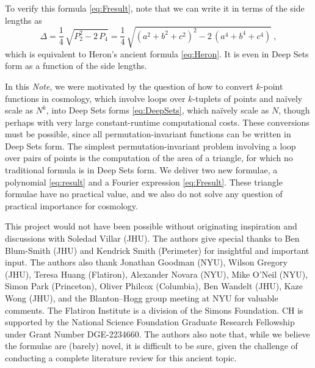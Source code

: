 \documentclass[10pt]{article}
\newcommand{\documentname}{\textsl{Note}}
\newcommand{\secbreak}{\bigskip{\centering\footnotesize%
\rotatebox[origin=c]{55}{$\triangle$}~~~%
\rotatebox[origin=c]{35}{$\triangle$}~~~%
\rotatebox[origin=c]{15}{$\triangle$}\par}\bigskip\noindent}
\begin{document}
To verify this formula \eqref{eq:Fresult}, note that we can write it in terms of the side lengths as
\begin{equation}
\label{eq:HeronDeepSets}
    \Delta = \frac{1}{4} \, \sqrt{
        P_2^2
        - 2 \, P_4
    }
    = \frac{1}{4} \, \sqrt{
        \left( a^2 + b^2 + c^2 \right)^2
        - 2 \, \left( a^4 + b^4 + c^4 \right)
    }~,
\end{equation}
which is equivalent to Heron's ancient formula \eqref{eq:Heron}.
It is even in Deep Sets form as a function of the side lengths.

\secbreak
In this \documentname, we were motivated by the question of how to convert $k$-point functions in cosmology, which involve loops over $k$-tuplets of points and na\"ively scale as $N^k$, into Deep Sets forms \eqref{eq:DeepSets}, which na\"ively scale as $N$, though perhaps with very large constant-runtime computational costs.
These conversions must be possible, since all permutation-invariant functions can be written in Deep Sets form.
The simplest permutation-invariant problem involving a loop over pairs of points is the computation of the area of a triangle, for which no traditional formula is in Deep Sets form.
We deliver two new formulae, a polynomial \eqref{eq:result} and a Fourier expression \eqref{eq:Fresult}.
These triangle formulae have no practical value, and we also do not solve any question of practical importance for cosmology.



{\footnotesize\par\bigskip\noindent
This project would not have been possible without originating inspiration and discussions with Soledad Villar (JHU).
The authors give special thanks to Ben Blum-Smith (JHU) and Kendrick Smith (Perimeter) for insightful and important input.
The authors also thank
  Jonathan Goodman (NYU),
  Wilson Gregory (JHU),
  Teresa Huang (Flatiron),
  Alexander Novara (NYU),
  Mike O'Neil (NYU),
  Simon Park (Princeton),
  Oliver Philcox (Columbia),
  Ben Wandelt (JHU),
  Kaze Wong (JHU),
and the Blanton--Hogg group meeting at NYU for valuable comments.
The Flatiron Institute is a division of the Simons Foundation.
CH is supported by the National Science Foundation Graduate Research Fellowship under Grant Number DGE-2234660.
The authors also note that, while we believe the formulae are (barely) novel, it is difficult to be sure, given the challenge of conducting a complete literature review for this ancient topic.\par}
\end{document}
